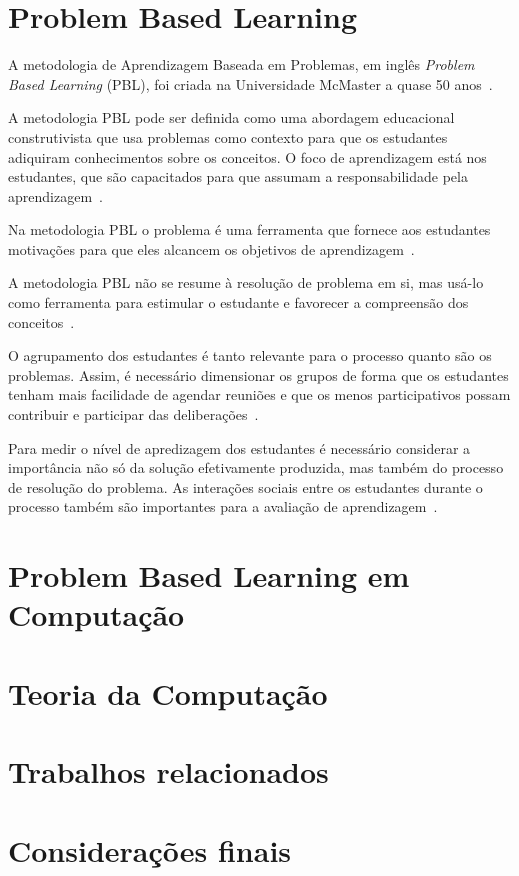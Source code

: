 \acresetall
\section{Problem Based Learning}

A metodologia de Aprendizagem Baseada em Problemas, em inglês \textit{Problem Based Learning} (PBL),
foi criada na Universidade McMaster a quase 50 anos~\cite{albanese2010problem}.

A metodologia PBL pode ser definida como uma abordagem educacional
construtivista que usa problemas como contexto para que os estudantes
adiquiram conhecimentos sobre os conceitos. O foco de aprendizagem está
nos estudantes, que são capacitados para que assumam a responsabilidade pela
aprendizagem~\cite{dolmans2005problem, albanese2010problem}.

Na metodologia PBL o problema é uma ferramenta que fornece
aos estudantes motivações para que eles alcancem os
objetivos de aprendizagem~\cite{wood2003problem, o2012practical}.

A metodologia PBL não se resume à resolução de problema em si, mas usá-lo
como ferramenta para estimular o estudante e favorecer a compreensão dos
conceitos~\cite{wood2003problem}.

O agrupamento dos estudantes é tanto relevante para o processo quanto
são os problemas. Assim, é necessário dimensionar os grupos de forma
que os estudantes tenham mais facilidade de agendar reuniões e que
os menos participativos possam contribuir e participar das
deliberações~\cite{albanese2010problem}.

Para medir o nível de apredizagem dos estudantes é necessário considerar
a importância não só da solução efetivamente produzida, mas também do
processo de resolução do problema.
As interações sociais entre os estudantes durante
o processo também são importantes para a
avaliação de aprendizagem~\cite{albanese2010problem}.

\section{Problem Based Learning em Computação}
\section{Teoria da Computação}
\section{Trabalhos relacionados}
\section{Considerações finais}
